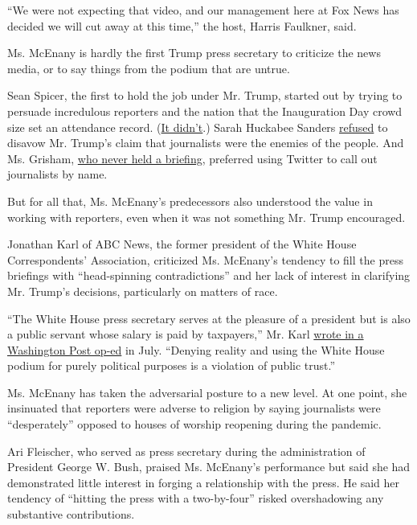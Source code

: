 ``We were not expecting that video, and our management here at Fox News
has decided we will cut away at this time,'' the host, Harris Faulkner,
said.

Ms. McEnany is hardly the first Trump press secretary to criticize the
news media, or to say things from the podium that are untrue.

Sean Spicer, the first to hold the job under Mr. Trump, started out by
trying to persuade incredulous reporters and the nation that the
Inauguration Day crowd size set an attendance record.
(\href{https://www.nytimes3xbfgragh.onion/2017/01/22/us/politics/president-trump-inauguration-crowd-white-house.html}{It
didn't}.) Sarah Huckabee Sanders
\href{https://www.theguardian.com/us-news/2018/aug/03/sanders-trump-acosta-media-enemy}{refused}
to disavow Mr. Trump's claim that journalists were the enemies of the
people. And Ms. Grisham,
\href{https://www.nytimes3xbfgragh.onion/2020/01/10/business/media/stephanie-grisham-trump-press-secretary.html}{who
never held a briefing}, preferred using Twitter to call out journalists
by name.

But for all that, Ms. McEnany's predecessors also understood the value
in working with reporters, even when it was not something Mr. Trump
encouraged.

Jonathan Karl of ABC News, the former president of the White House
Correspondents' Association, criticized Ms. McEnany's tendency to fill
the press briefings with ``head-spinning contradictions'' and her lack
of interest in clarifying Mr. Trump's decisions, particularly on matters
of race.

``The White House press secretary serves at the pleasure of a president
but is also a public servant whose salary is paid by taxpayers,'' Mr.
Karl
\href{https://www.washingtonpost.com/opinions/its-the-duty-of-the-white-house-press-secretary-to-hold-briefings-but-not-like-this/2020/07/10/1a61ae78-c2cc-11ea-b178-bb7b05b94af1_story.html}{wrote
in a Washington Post op-ed} in July. ``Denying reality and using the
White House podium for purely political purposes is a violation of
public trust.''

Ms. McEnany has taken the adversarial posture to a new level. At one
point, she insinuated that reporters were adverse to religion by saying
journalists were ``desperately'' opposed to houses of worship reopening
during the pandemic.

Ari Fleischer, who served as press secretary during the administration
of President George W. Bush, praised Ms. McEnany's performance but said
she had demonstrated little interest in forging a relationship with the
press. He said her tendency of ``hitting the press with a two-by-four''
risked overshadowing any substantive contributions.


